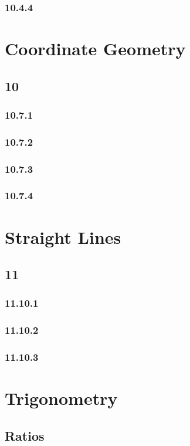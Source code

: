 \documentclass[11pt]{book}
\begin{document}
\subsection{10.4.4}

\chapter{Coordinate Geometry}
\section{10}
\subsection{10.7.1}

\subsection{10.7.2}

\subsection{10.7.3}

\subsection{10.7.4}

\chapter{Straight Lines}
\section{11}
\subsection{11.10.1}

\subsection{11.10.2}

\subsection{11.10.3}

\chapter{Trigonometry}
\section{Ratios}

\end{document}
